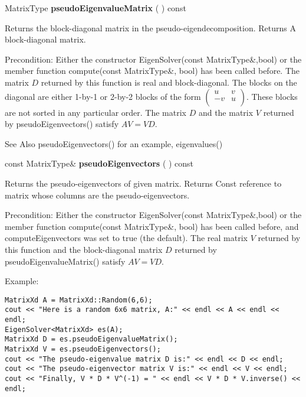 \vspace{0.3cm}
MatrixType \textbf{pseudoEigenvalueMatrix}  ( )  const 

Returns the block-diagonal matrix in the pseudo-eigendecomposition. 
Returns A block-diagonal matrix.

Precondition: Either the constructor EigenSolver(const MatrixType\&,bool) or the member function compute(const MatrixType\&, bool) has been called before.
The matrix $D$ returned by this function is real and block-diagonal. The blocks on the diagonal are either 1-by-1 or 2-by-2 blocks of the form $\begin{pmatrix}
u & v \\
-v & u \\
\end{pmatrix}
$. These blocks are not sorted in any particular order. The matrix $D$ and the matrix $V$ returned by pseudoEigenvectors() satisfy $A V = V D$.

See Also pseudoEigenvectors() for an example, eigenvalues() 


\vspace{0.3cm}
const MatrixType\& \textbf{pseudoEigenvectors}  ( )  const 

Returns the pseudo-eigenvectors of given matrix. 
Returns Const reference to matrix whose columns are the pseudo-eigenvectors.

Precondition: Either the constructor EigenSolver(const MatrixType\&,bool) or the member function compute(const MatrixType\&, bool) has been called before, and computeEigenvectors was set to true (the default).
The real matrix $V$ returned by this function and the block-diagonal matrix $D$ returned by pseudoEigenvalueMatrix() satisfy $A V = V D$.


Example:
\begin{lstlisting}
MatrixXd A = MatrixXd::Random(6,6);
cout << "Here is a random 6x6 matrix, A:" << endl << A << endl << endl;
EigenSolver<MatrixXd> es(A);
MatrixXd D = es.pseudoEigenvalueMatrix();
MatrixXd V = es.pseudoEigenvectors();
cout << "The pseudo-eigenvalue matrix D is:" << endl << D << endl;
cout << "The pseudo-eigenvector matrix V is:" << endl << V << endl;
cout << "Finally, V * D * V^(-1) = " << endl << V * D * V.inverse() << endl;
\end{lstlisting}

